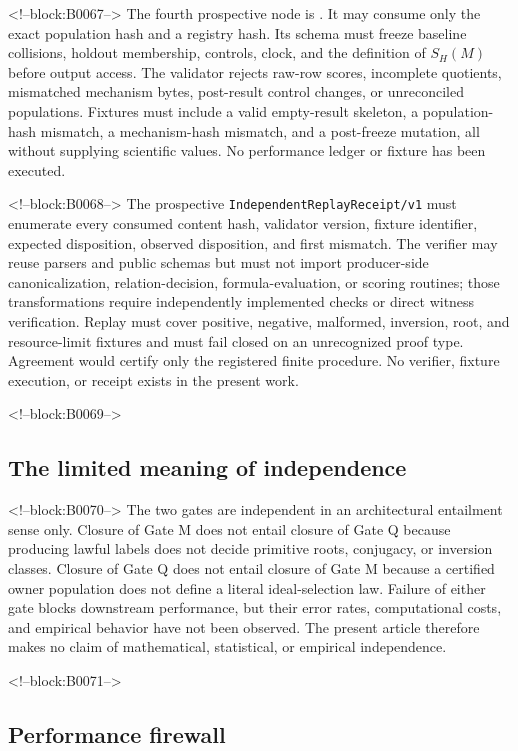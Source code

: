 \documentclass[11pt,a4paper]{article}
\begin{document}
<!--block:B0067-->
The fourth prospective node is . It may consume only the exact  population hash and a  registry hash. Its schema must freeze baseline collisions, holdout membership, controls, clock, and the definition of \(S_H(M)\) before output access. The validator rejects raw-row scores, incomplete quotients, mismatched mechanism bytes, post-result control changes, or unreconciled populations. Fixtures must include a valid empty-result skeleton, a population-hash mismatch, a mechanism-hash mismatch, and a post-freeze mutation, all without supplying scientific values. No performance ledger or fixture has been executed.

<!--block:B0068-->
The prospective \texttt{IndependentReplayReceipt/v1} must enumerate every consumed content hash, validator version, fixture identifier, expected disposition, observed disposition, and first mismatch. The verifier may reuse parsers and public schemas but must not import producer-side canonicalization, relation-decision, formula-evaluation, or scoring routines; those transformations require independently implemented checks or direct witness verification. Replay must cover positive, negative, malformed, inversion, root, and resource-limit fixtures and must fail closed on an unrecognized proof type. Agreement would certify only the registered finite procedure. No verifier, fixture execution, or receipt exists in the present work.

<!--block:B0069-->
\subsection{The limited meaning of independence}

<!--block:B0070-->
The two gates are independent in an architectural entailment sense only. Closure of Gate M does not entail closure of Gate Q because producing lawful labels does not decide primitive roots, conjugacy, or inversion classes. Closure of Gate Q does not entail closure of Gate M because a certified owner population does not define a literal ideal-selection law. Failure of either gate blocks downstream performance, but their error rates, computational costs, and empirical behavior have not been observed. The present article therefore makes no claim of mathematical, statistical, or empirical independence.

<!--block:B0071-->
\subsection{Performance firewall}
\end{document}
